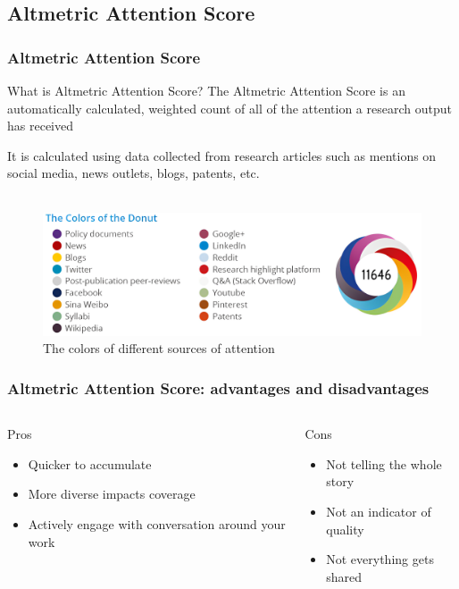 \documentclass{beamer}
\newcommand{\pros}{\item[{\textcolor[HTML]{3C8031}{\ding{51}}}]}
\newcommand{\cons}{\item[\textcolor{red}{\ding{54}}]}
\begin{document}
\subsection{Altmetric Attention Score}
\begin{frame}
    \frametitle{Altmetric Attention Score}
    \begin{block}{What is Altmetric Attention Score?}
        The Altmetric Attention Score is an automatically calculated, weighted count of all of the attention a research output has received
    \end{block}

    It is calculated using data collected from research articles such as mentions
    on social media, news outlets, blogs, patents, etc.\\~\

    \begin{figure}[h]
        \includegraphics[height=0.42\textheight]{altscore.png}
        \caption{The colors of different sources of attention}
    \end{figure}
\end{frame}

\begin{frame}
    \frametitle{Altmetric Attention Score: advantages and disadvantages}
    \begin{columns}[T]
        \begin{column}{.5\textwidth}
            \centering Pros
            \begin{itemize}[<+->]
                \pros Quicker to accumulate
                \pros More diverse impacts coverage
                \pros Actively engage with conversation around your work
            \end{itemize}
        \end{column}
        \begin{column}{.5\textwidth}
            \centering Cons
            \begin{itemize}[<+->]
                \cons Not telling the whole story
                \cons Not an indicator of quality
                \cons Not everything gets shared
            \end{itemize}
        \end{column}
    \end{columns}
\end{frame}
\end{document}
